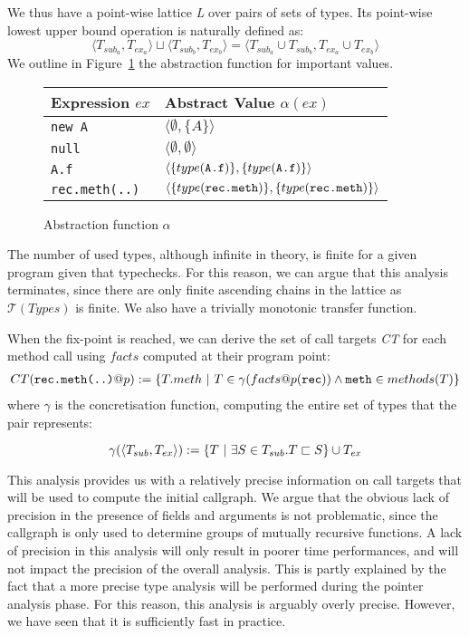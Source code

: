 We thus have a point-wise lattice \emph{L} over pairs of sets of types. Its
point-wise lowest upper bound operation is naturally defined as:
$$
    \langle T_{sub_a}, T_{ex_a} \rangle \sqcup  \langle T_{sub_b}, T_{ex_b} \rangle =  \langle T_{sub_a} \cup T_{sub_b}, T_{ex_a} \cup T_{ex_b} \rangle
$$
We outline in Figure~\ref{fig:ta:tf}
the abstraction function for important values.
\FloatBarrier
\begin{figure}[h]
    \centering

    \begin{tabular}{ l | l }
        Expression $ex$       & Abstract Value $\alpha(ex)$\\
        \hline
        \verb/new A/          & $\langle \emptyset, \{ A \} \rangle$ \\
        \verb/null/           & $\langle \emptyset, \emptyset \rangle$ \\
        \verb/A.f/            & $\langle\{type(\verb/A.f/)\}, \{type(\verb/A.f/)\} \rangle$ \\
        \verb/rec.meth(..)/   & $\langle\{type(\verb/rec.meth/)\}, \{type(\verb/rec.meth/)\} \rangle$ \\
    \end{tabular}

    \caption{Abstraction function $\alpha$}
    \label{fig:ta:tf}
\end{figure}

The number of used types, although infinite in theory, is finite for a given
program given that typechecks.  For this reason, we can argue that this
analysis terminates, since there are only finite ascending chains in the
lattice as $\mathcal{T}(Types)$ is finite. We also have a trivially monotonic
transfer function.

When the fix-point is reached, we can derive the set of call targets \emph{CT}
for each method call using $facts$ computed at their program point:
\begin{eqnarray*}
    CT(\verb/rec.meth(..)/ @ p) := \{ T.meth ~|~ T \in \gamma(facts@p(\verb/rec/)) \land \verb/meth/ \in methods(T) \}
\end{eqnarray*}
where $\gamma$ is the concretisation function, computing the entire set of
types that the pair represents:

$$
\gamma(\langle T_{sub}, T_{ex} \rangle ) := \{ T ~|~ \exists S \in T_{sub}. T \sqsubset S\} \cup T_{ex}
$$

This analysis provides us with a relatively precise information on call targets
that will be used to compute the initial callgraph. We argue that the obvious
lack of precision in the presence of fields and arguments is not problematic,
since the callgraph is only used to determine groups of mutually recursive
functions. A lack of precision in this analysis will only result in poorer time
performances, and will not impact the precision of the overall analysis. This
is partly explained by the fact that a more precise type analysis will be
performed during the pointer analysis phase. For this reason, this analysis is
arguably overly precise. However, we have seen that it is sufficiently fast in
practice.
